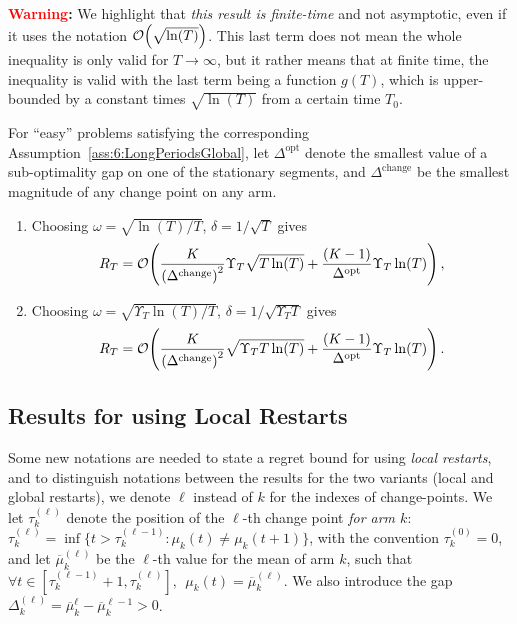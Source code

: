 \textbf{\textcolor{red}{Warning}:}
%
We highlight that \emph{this result is finite-time} and not asymptotic, even if it uses the notation $\mathop{}\mathopen{}\mathcal{O}\mathopen{}\left(\sqrt{\ln(T)}\right)$.
This last term does not mean the whole inequality is only valid for $T\to\infty$, but it rather means that at finite time, the inequality is valid with the last term being a function $g(T)$, which is upper-bounded by a constant times $\sqrt{\ln(T)}$ from a certain time $T_0$.

\begin{corollary}\label{cor:6:Global}
    For ``easy'' problems satisfying the corresponding Assumption~\ref{ass:6:LongPeriodsGlobal},
    let $\Delta^{\text{opt}}$ denote the smallest value of a sub-optimality gap on one of the stationary segments, and $\Delta^{\text{change}}$ be the smallest magnitude of any change point on any arm.
    \begin{enumerate}
        \item Choosing $\omega = \sqrt{\ln(T)/T}$, $\delta = 1/\sqrt{T}$ gives
        \begin{equation}
            R_T = \mathop{}\mathopen{}\mathcal{O}\mathopen{}\left(\frac{K}{\left(\Delta^{\text{change}}\right)^2} \Upsilon_T\sqrt{T\ln(T)} + \frac{(K-1)}{\Delta^{\text{opt}}} \Upsilon_T\ln(T)\right),
        \end{equation}
        \item Choosing $\omega = \sqrt{\Upsilon_T\ln(T) / T}$, $\delta = 1 / \sqrt{\Upsilon_T T}$ gives
        \begin{equation}
            R_T = \mathop{}\mathopen{}\mathcal{O}\mathopen{}\left(\frac{K}{\left(\Delta^{\text{change}}\right)^2}\sqrt{\Upsilon_T T \ln(T)} + \frac{(K-1)}{\Delta^{\text{opt}}} \Upsilon_T\ln(T)\right).
        \end{equation}
    \end{enumerate}
\end{corollary}


\subsection{Results for \GLRklUCB{} using Local Restarts}

Some new notations are needed to state a regret bound for \GLRklUCB{} using \emph{local restarts},
and to distinguish notations between the results for the two variants (local and global restarts), we denote $\ell$ instead of $k$ for the indexes of change-points.
We let $\tau_k^{(\ell)}$ denote the position of the $\ell$-th change point \emph{for arm $k$}: $\tau_k^{(\ell)} = \inf \{ t > \tau_k^{(\ell - 1)} : \mu_k(t) \neq \mu_k(t+1)\}$,
with the convention $\tau_k^{(0)}=0$, and let $\overline{\mu}_k^{(\ell)}$ be the $\ell$-th value for the mean of arm $k$, such that $\forall t \in [\tau_k^{(\ell-1)}+1, \tau_k^{(\ell)}], \ \ \mu_k(t) = \overline{\mu}_k^{(\ell)}$.
We also introduce the gap $\Delta_k^{(\ell)} = \overline{\mu}_k^{\ell} - \overline{\mu}_k^{\ell-1} > 0$.

